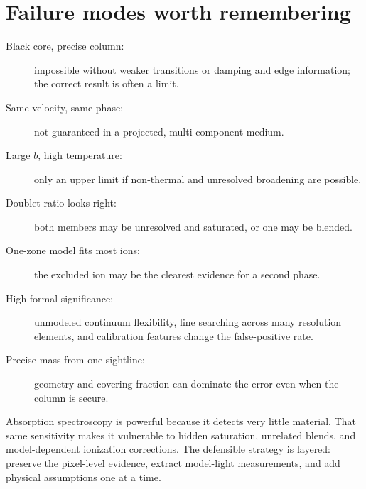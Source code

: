 \section{Failure modes worth remembering}

\begin{description}
  \item[Black core, precise column:] impossible without weaker transitions or
  damping and edge information; the correct result is often a limit.
  \item[Same velocity, same phase:] not guaranteed in a projected,
  multi-component medium.
  \item[Large $b$, high temperature:] only an upper limit if non-thermal and
  unresolved broadening are possible.
  \item[Doublet ratio looks right:] both members may be unresolved and
  saturated, or one may be blended.
  \item[One-zone model fits most ions:] the excluded ion may be the clearest
  evidence for a second phase.
  \item[High formal significance:] unmodeled continuum flexibility, line
  searching across many resolution elements, and calibration features change
  the false-positive rate.
  \item[Precise mass from one sightline:] geometry and covering fraction can
  dominate the error even when the column is secure.
\end{description}

Absorption spectroscopy is powerful because it detects very little material.
That same sensitivity makes it vulnerable to hidden saturation, unrelated
blends, and model-dependent ionization corrections. The defensible strategy
is layered: preserve the pixel-level evidence, extract model-light
measurements, and add physical assumptions one at a time.
